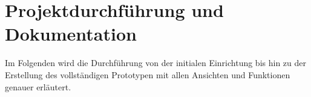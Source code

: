 \chapter{Projektdurchführung und Dokumentation}
Im Folgenden wird die Durchführung von der initialen Einrichtung bis hin zu der Erstellung des vollständigen Prototypen mit allen Ansichten und Funktionen genauer erläutert. 